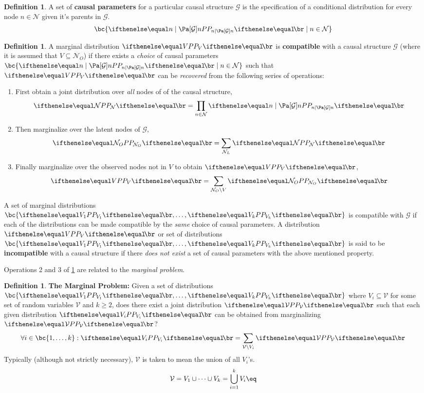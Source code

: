 \documentclass[aps, 10pt, english, twoside, pra, nofootinbib, longbibliography]{revtex4-1}
\theoremstyle{plain}
\theoremstyle{definition}
\newtheorem{definition}[theorem]{Definition}
\theoremstyle{remark}
\newcommand{\graph}{\mathcal{G}}
\newcommand{\nodes}{\mathcal{N}}
\newcommand{\term}[1]{\textcolor{Mahogany}{\textbf{#1}}}
\begin{document}
    \begin{definition}
        A set of \term{causal parameters} for a particular causal structure $\graph$ is the specification of a conditional distribution for every node $n \in \nodes$ given it's parents in $\graph$.
        \[ \bc{\prob[n \mid \Pa[\graph]{n}] \mid n \in \nodes} \]
    \end{definition}
    \begin{definition}
        \label{def:compatible}
        A marginal distribution $\prob[V]$ is \term{compatible} with a causal structure $\graph$ (where it is assumed that $V \subseteq \nodes_O$) if there exists a \textit{choice} of causal parameters $\bc{\prob[n \mid \Pa[\graph]{n}] \mid n \in \nodes}$ such that $\prob[V]$ can be \textit{recovered} from the following series of operations:

        \begin{enumerate}
            \item First obtain a joint distribution over \textit{all} nodes of of the causal structure,
            \[ \prob[\nodes] = \prod_{n \in \nodes} \prob[n \mid \Pa[\graph]{n}] \]
            \item Then marginalize over the latent nodes of $\graph$,
            \[ \prob[\nodes_O] = \sum_{\nodes_L} \prob[\nodes] \]
            \item Finally marginalize over the observed nodes not in $V$ to obtain $\prob[V]$,
            \[ \prob[V] = \sum_{\nodes_O \setminus V} \prob[\nodes_O] \]
        \end{enumerate}
        A set of marginal distributions $\bc{\prob[V_1], \ldots, \prob[V_k]}$ is compatible with $\graph$ if each of the distributions can be made compatible by the \textit{same} choice of causal parameters.
        A distribution $\prob[V]$ or set of distributions $\bc{\prob[V_1], \ldots, \prob[V_k]}$ is said to be \term{incompatible} with a causal structure if there \textit{does not exist} a set of causal parameters with the above mentioned property.

    \end{definition}
    Operations 2 and 3 of \cref{def:compatible} are related to the \textit{marginal problem}.
    \begin{definition}
        \label{def:marginal_problem}
        \term{The Marginal Problem:} Given a set of distributions $\bc{\prob[V_1], \ldots, \prob[V_k]}$ where $V_i \subseteq \mathcal{V}$ for some set of random variables $\mathcal{V}$ and $k \geq 2$, does there exist a joint distribution $\prob[\mathcal{V}]$ such that each given distribution $\prob[V_i]$ can be obtained from marginalizing $\prob[\mathcal{V}]$?
        \[ \forall i \in \bc{1, \ldots, k} : \prob[V_i] = \sum_{\mathcal{V} \setminus V_i} \prob[\mathcal{V}] \]
        Typically (although not strictly necessary), $\mathcal{V}$ is taken to mean the union of all $V_i$'s.
        \[ \mathcal{V} = V_1 \cup \cdots \cup V_k = \bigcup_{i=1}^{k} V_i \eq \label{eq:marginals_union} \]
    \end{definition}
\end{document}
